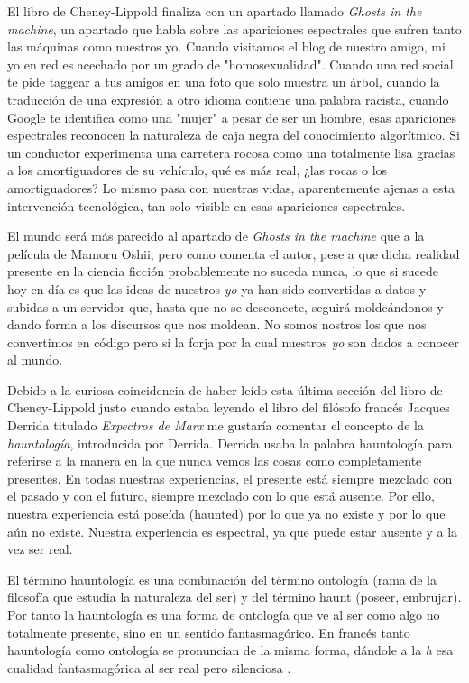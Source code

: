 \documentclass[11pt]{article}
\begin{document}
El libro de Cheney-Lippold finaliza con un apartado llamado \textit{Ghosts in the machine}, un apartado que habla sobre las apariciones espectrales que sufren tanto las máquinas como nuestros yo. Cuando visitamos el blog de nuestro amigo, mi yo en red es acechado por un grado de "homosexualidad". Cuando una red social te pide taggear a tus amigos en una foto que solo muestra un árbol, cuando la traducción de una expresión a otro idioma contiene una palabra racista, cuando Google te identifica como una "mujer" a pesar de ser un hombre, esas apariciones espectrales reconocen la naturaleza de caja negra del conocimiento algorítmico. Si un conductor experimenta una carretera rocosa como una totalmente lisa gracias a los amortiguadores de su vehículo, qué es más real, ¿las rocas o los amortiguadores? Lo mismo pasa con nuestras vidas, aparentemente ajenas a esta intervención tecnológica, tan solo visible en esas apariciones espectrales.

El mundo será más parecido al apartado de \textit{Ghosts in the machine} que a la película de Mamoru Oshii, pero como comenta el autor, pese a que dicha realidad presente en la ciencia ficción probablemente no suceda nunca, lo que si sucede hoy en día es que las ideas de nuestros \textit{yo} ya han sido convertidas a datos y subidas a un servidor que, hasta que no se desconecte, seguirá moldeándonos y dando forma a los discursos que nos moldean. No somos nostros los que nos convertimos en código pero si la forja por la cual nuestros \textit{yo} son dados a conocer al mundo.

Debido a la curiosa coincidencia de haber leído esta última sección del libro de Cheney-Lippold justo cuando estaba leyendo el libro del filósofo francés Jacques Derrida titulado \textit{Expectros de Marx} me gustaría comentar el concepto de la \textit{hauntología}, introducida por Derrida. Derrida usaba la palabra hauntología para referirse a la manera en la que nunca vemos las cosas como completamente presentes. En todas nuestras experiencias, el presente está siempre mezclado con el pasado y con el futuro, siempre mezclado con lo que está ausente. Por ello, nuestra experiencia está poseída (haunted) por lo que ya no existe y por lo que aún no existe. Nuestra experiencia es espectral, ya que puede estar ausente y a la vez ser real.

El término hauntología es una combinación del término ontología (rama de la filosofía que estudia la naturaleza del ser) y del término haunt (poseer, embrujar). Por tanto la hauntología es una forma de ontología que ve al ser como algo no totalmente presente, sino en un sentido fantasmagórico. En francés tanto hauntología como ontología se pronuncian de la misma forma, dándole a la \textit{h} esa cualidad fantasmagórica al ser real pero silenciosa \cite{cp-hauntology}.
\end{document}
